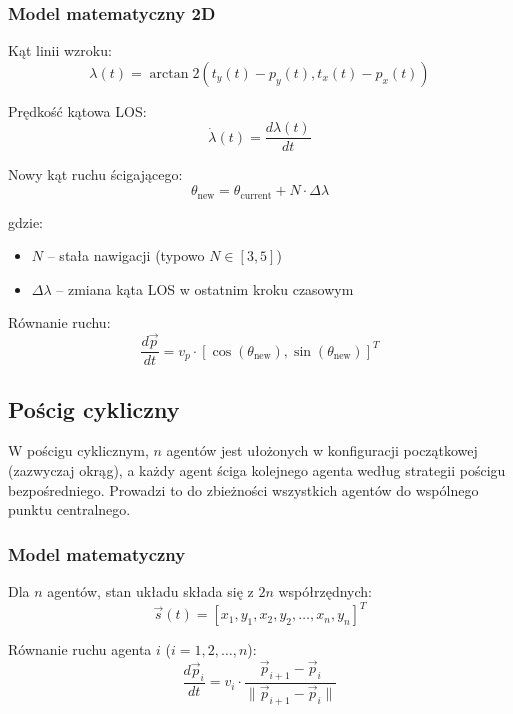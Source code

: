 \documentclass[12pt,a4paper]{article}
\begin{document}
\subsubsection{Model matematyczny 2D}

Kąt linii wzroku:
\begin{equation}
\lambda(t) = \arctan2(t_y(t) - p_y(t), t_x(t) - p_x(t))
\end{equation}

Prędkość kątowa LOS:
\begin{equation}
\dot{\lambda}(t) = \frac{d\lambda(t)}{dt}
\end{equation}

Nowy kąt ruchu ścigającego:
\begin{equation}
\theta_{\text{new}} = \theta_{\text{current}} + N \cdot \Delta\lambda
\end{equation}

gdzie:
\begin{itemize}
    \item $N$ -- stała nawigacji (typowo $N \in [3, 5]$)
    \item $\Delta\lambda$ -- zmiana kąta LOS w ostatnim kroku czasowym
\end{itemize}

Równanie ruchu:
\begin{equation}
\frac{d\vec{p}}{dt} = v_p \cdot [\cos(\theta_{\text{new}}), \sin(\theta_{\text{new}})]^T
\end{equation}

\subsection{Pościg cykliczny}

W pościgu cyklicznym, $n$ agentów jest ułożonych w konfiguracji początkowej (zazwyczaj okrąg), a każdy agent ściga kolejnego agenta według strategii pościgu bezpośredniego. Prowadzi to do zbieżności wszystkich agentów do wspólnego punktu centralnego.

\subsubsection{Model matematyczny}

Dla $n$ agentów, stan układu składa się z $2n$ współrzędnych:
\begin{equation}
\vec{s}(t) = [x_1, y_1, x_2, y_2, \ldots, x_n, y_n]^T
\end{equation}

Równanie ruchu agenta $i$ ($i = 1, 2, \ldots, n$):
\begin{equation}
\frac{d\vec{p}_i}{dt} = v_i \cdot \frac{\vec{p}_{i+1} - \vec{p}_i}{\|\vec{p}_{i+1} - \vec{p}_i\|}
\end{equation}
\end{document}
